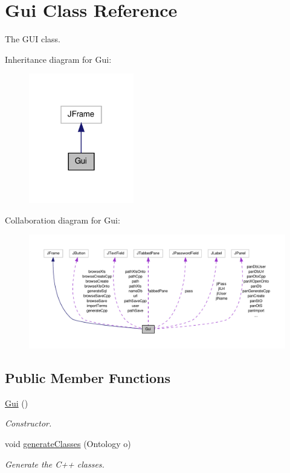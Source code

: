 \hypertarget{class_gui}{
\section{Gui Class Reference}
\label{class_gui}
}


The GUI class.  




Inheritance diagram for Gui:\nopagebreak
\begin{figure}[H]
\begin{center}
\leavevmode
\includegraphics[width=130pt]{class_gui__inherit__graph}
\end{center}
\end{figure}


Collaboration diagram for Gui:
\nopagebreak
\begin{figure}[H]
\begin{center}
\leavevmode
\includegraphics[width=400pt]{class_gui__coll__graph}
\end{center}
\end{figure}
\subsection*{Public Member Functions}
\begin{DoxyCompactItemize}
\item 
\hyperlink{class_gui_aa803177c18d790a882ffcbae64b7ebbf}{Gui} ()
\begin{DoxyCompactList}\small\item\em Constructor. \end{DoxyCompactList}\item 
void \hyperlink{class_gui_a8625b72e14c540c8aaef92127a14fca7}{generateClasses} (Ontology o)
\begin{DoxyCompactList}\small\item\em Generate the C++ classes. \end{DoxyCompactList}\end{DoxyCompactItemize}
